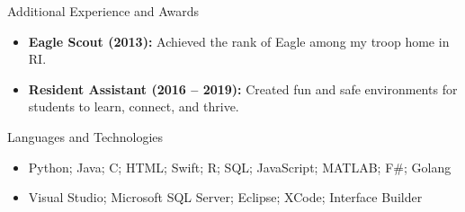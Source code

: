 \documentclass[]{mcdowellcv}
\begin{document}
	\begin{cvsection}{Additional Experience and Awards}
		\begin{cvsubsection}{}{}{}	
			\begin{itemize}
				\item \textbf{Eagle Scout (2013):} Achieved the rank of Eagle among my troop home in RI.
				\item \textbf{Resident Assistant (2016 -- 2019):} Created fun and safe environments for students to learn, connect, and thrive.
			\end{itemize}
		\end{cvsubsection}
	\end{cvsection}
	
	\begin{cvsection}{Languages and Technologies}
		\begin{cvsubsection}{}{}{}	
			\begin{itemize}
				\item Python; Java; C; HTML; Swift; R; SQL; JavaScript; MATLAB; F\#; Golang
				\item Visual Studio; Microsoft SQL Server; Eclipse; XCode; Interface Builder
			\end{itemize}
		\end{cvsubsection}
	\end{cvsection}
	
\end{document}

